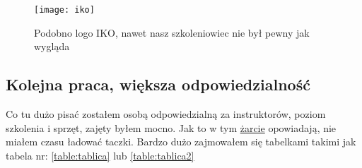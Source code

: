 \documentclass{article}
\begin{document}
	\begin{figure}[h]
			\centering
			\texttt{[image: iko]}
			\caption{Podobno logo IKO, nawet nasz szkoleniowiec nie był pewny jak wygląda}
		\end{figure}
	
	\subsection{Kolejna praca, większa odpowiedzialność}
	Co tu dużo pisać zostałem osobą odpowiedzialną za instruktorów, poziom szkolenia i sprzęt, zajęty byłem mocno. Jak to w tym \href{https://www.computerworld.pl/felieton/Pusta-taczka,298952.html}{żarcie} opowiadają, nie miałem czasu ładować taczki. Bardzo dużo zajmowałem się tabelkami takimi jak tabela nr: \ref{table:tablica} lub \ref{table:tablica2}
	
\end{document}
